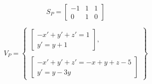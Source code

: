 \begin{center}
	\begin{minipage}{0.3\linewidth}
		\begin{equation*}
		S_P = 
			\begin{bmatrix}
				-1 & 1 & 1 \\
				0 & 1 & 0
			\end{bmatrix}
		\end{equation*}
	\end{minipage}
	\begin{minipage}{0.6\linewidth}
		\begin{equation*}
		    V_P = \begin{Bmatrix}
		              \begin{bmatrix}
		                    -x' + y' + z' = 1 \\
		                    y' = y + 1
		               \end{bmatrix}, \\ \\
		               \begin{bmatrix}
		                     -x' + y' + z' = -x + y + z - 5 \\
		                    y' = y - 3y
		               \end{bmatrix}
		    \end{Bmatrix}
		\end{equation*}
	\end{minipage}
\end{center}
